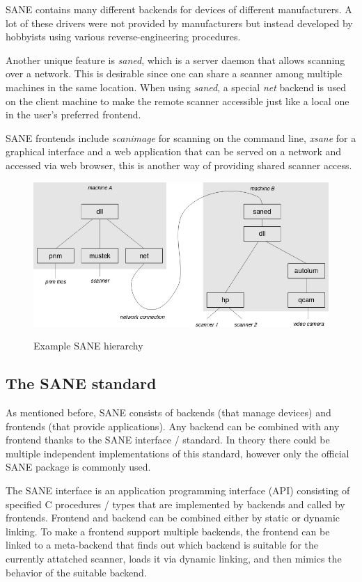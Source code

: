 \documentclass{article}
\begin{document}
SANE contains many different backends for devices of different manufacturers.
A lot of these drivers were not provided by manufacturers but instead
developed by hobbyists using various reverse-engineering procedures.

Another unique feature is {\it saned}, which is a server daemon that allows
scanning over a network. This is desirable since one can share a scanner
among multiple machines in the same location. When using {\it saned}, a
special {\it net} backend is used on the client machine to make
the remote scanner accessible just like a local one in the user's preferred frontend.

SANE frontends include {\it scanimage} for scanning on the command line,
{\it xsane} for a graphical interface and a web application that can be served
on a network and accessed via web browser, this is another way of providing shared
scanner access.

\begin{figure}[H]
  \caption{Example SANE hierarchy}
  \centering
  \includegraphics[width=\textwidth]{images/sane_hierarchy.jpg}
  \label{time_diagram}
\end{figure}

\subsection{The SANE standard}
\label{ssec:sanestd}

As mentioned before, SANE consists of backends (that manage devices) and frontends
(that provide applications). Any backend can be combined with any frontend
thanks to the SANE interface / standard. In theory there could be multiple independent
implementations of this standard, however only the official SANE package is
commonly used.

The SANE interface is an application programming interface (API) consisting
of specified C procedures / types that are implemented by backends and called by frontends.
Frontend and backend can be combined either by static or dynamic linking.
To make a frontend support multiple backends, the frontend can be linked to a
meta-backend that finds out which backend is suitable for the currently attatched
scanner, loads it via dynamic linking, and then mimics the behavior
of the suitable backend.
\end{document}

